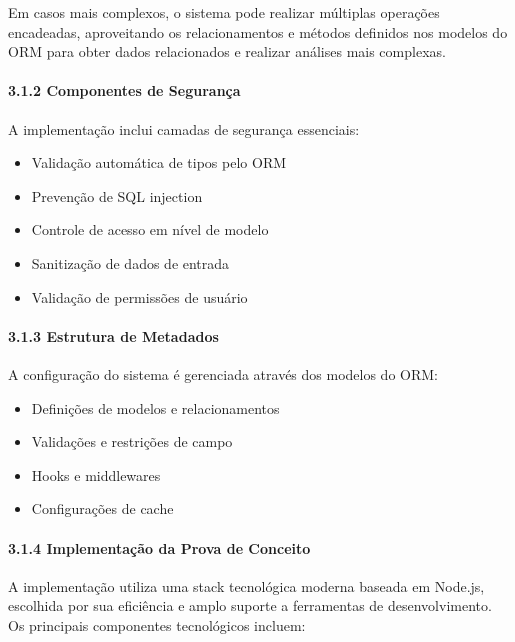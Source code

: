 \documentclass[
]{article}
\providecommand{\tightlist}{%
  \setlength{\itemsep}{0pt}\setlength{\parskip}{0pt}}
\begin{document}
Em casos mais complexos, o sistema pode realizar múltiplas operações
encadeadas, aproveitando os relacionamentos e métodos definidos nos
modelos do ORM para obter dados relacionados e realizar análises mais
complexas.

\paragraph{3.1.2 Componentes de
Segurança}\label{componentes-de-seguranuxe7a}

A implementação inclui camadas de segurança essenciais:

\begin{itemize}
\tightlist
\item
  Validação automática de tipos pelo ORM
\item
  Prevenção de SQL injection
\item
  Controle de acesso em nível de modelo
\item
  Sanitização de dados de entrada
\item
  Validação de permissões de usuário
\end{itemize}

\paragraph{3.1.3 Estrutura de Metadados}\label{estrutura-de-metadados}

A configuração do sistema é gerenciada através dos modelos do ORM:

\begin{itemize}
\tightlist
\item
  Definições de modelos e relacionamentos
\item
  Validações e restrições de campo
\item
  Hooks e middlewares
\item
  Configurações de cache
\end{itemize}

\paragraph{3.1.4 Implementação da Prova de
Conceito}\label{implementauxe7uxe3o-da-prova-de-conceito}

A implementação utiliza uma stack tecnológica moderna baseada em
Node.js, escolhida por sua eficiência e amplo suporte a ferramentas de
desenvolvimento. Os principais componentes tecnológicos incluem:
\end{document}
